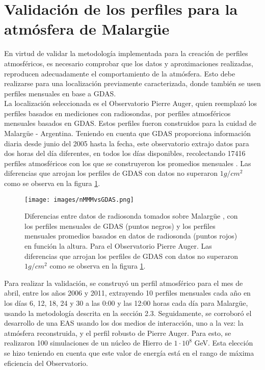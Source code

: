 \newpage 
\section{Validaci\'on de los perfiles para la atm\'osfera de Malarg\"ue}\label{sec:ref2}

En virtud de validar la metodología implementada para la creación de perfiles atmosféricos, es necesario comprobar que los datos y aproximaciones realizadas, reproducen adecuadamente el comportamiento de la atmósfera. Esto debe realizarse para una localización previamente caracterizada, donde también se usen perfiles mensuales en base a GDAS.\\

La localización seleccionada es el Observatorio Pierre Auger, quien reemplazó los perfiles basados en mediciones con radiosondas, por perfiles atmosféricos mensuales basados en GDAS. Estos perfiles fueron construidos para la cuidad de Malarg\"ue - Argentina. Teniendo en cuenta que GDAS proporciona información diaria desde junio del 2005 hasta la fecha, este observatorio extrajo datos para dos horas del día diferentes, en todos los días disponibles, recolectando 17416 perfiles atmosféricos con los que se construyeron los promedios mensuales \cite{GAP_2011NEW}. Las diferencias que arrojan los perfiles de GDAS con datos no superaron $1 g/cm^{2}$ como se observa en la figura \ref{fig:fig17}.\\

\begin{figure}[htb!]
\centering
\texttt{[image: images/nMMMvsGDAS.png]}
\caption[Diferencias entre datos de radiosonda y GDAS en función de la altura.]{Diferencias entre datos de radiosonda tomados sobre Malarg\"ue \cite{GDAS_Auger}, con los perfiles mensuales de GDAS (puntos negros) y los perfiles mensuales promedios basados en datos de radiosonda (puntos rojos) en función la altura. Para el Observatorio Pierre Auger. Las diferencias que arrojan los perfiles de GDAS con datos no superaron $1 g/cm^{2}$ como se observa en la figura \ref{fig:fig17}.}
 \label{fig:fig17}
 \end{figure}

Para realizar la validación, se construyó un perfil atmosférico para el mes de abril, entre los años 2006 y 2011, extrayendo 10 perfiles mensuales cada año en los días 6, 12, 18, 24 y 30 a las 0:00 y las 12:00 horas cada día para Malarg\"ue, usando la metodología descrita en la sección 2.3. Seguidamente, se corroboró el desarrollo de una EAS usando los dos medios de interacción, uno a la vez: la atmósfera reconstruida, y el perfil robusto de Pierre Auger. Para esto, se realizaron 100 simulaciones de un núcleo de Hierro de $1 \cdot 10^{8}$ GeV. Esta elección se hizo teniendo en cuenta que este valor de energía está en el rango de máxima eficiencia del Observatorio. \\

